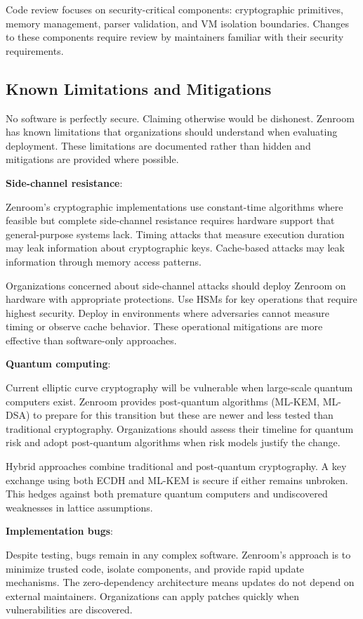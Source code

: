 Code review focuses on security-critical components: cryptographic
primitives, memory management, parser validation, and VM isolation
boundaries. Changes to these components require review by maintainers
familiar with their security requirements.

\subsection{Known Limitations and Mitigations}

No software is perfectly secure. Claiming otherwise would be
dishonest. Zenroom has known limitations that organizations should
understand when evaluating deployment. These limitations are
documented rather than hidden and mitigations are provided where
possible.

\textbf{Side-channel resistance}:

Zenroom's cryptographic implementations use constant-time algorithms
where feasible but complete side-channel resistance requires hardware
support that general-purpose systems lack. Timing attacks that measure
execution duration may leak information about cryptographic
keys. Cache-based attacks may leak information through memory access
patterns.

Organizations concerned about side-channel attacks should deploy
Zenroom on hardware with appropriate protections. Use HSMs for key
operations that require highest security. Deploy in environments where
adversaries cannot measure timing or observe cache behavior. These
operational mitigations are more effective than software-only
approaches.

\textbf{Quantum computing}:

Current elliptic curve cryptography will be vulnerable when
large-scale quantum computers exist. Zenroom provides post-quantum
algorithms (ML-KEM, ML-DSA) to prepare for this transition but these
are newer and less tested than traditional cryptography. Organizations
should assess their timeline for quantum risk and adopt post-quantum
algorithms when risk models justify the change.

Hybrid approaches combine traditional and post-quantum cryptography. A
key exchange using both ECDH and ML-KEM is secure if either remains
unbroken. This hedges against both premature quantum computers and
undiscovered weaknesses in lattice assumptions.

\textbf{Implementation bugs}:

Despite testing, bugs remain in any complex software. Zenroom's
approach is to minimize trusted code, isolate components, and provide
rapid update mechanisms. The zero-dependency architecture means
updates do not depend on external maintainers. Organizations can apply
patches quickly when vulnerabilities are discovered.

